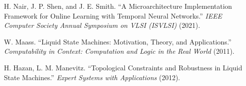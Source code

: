 \begin{thebibliography}{00}

    H. Nair, J. P. Shen, and J. E. Smith.
    ``A Microarchitecture Implementation Framework for Online Learning with Temporal Neural Networks.''
    \textit{IEEE Computer Society Annual Symposium on VLSI (ISVLSI)}
    (2021).

    W. Maass.
    ``Liquid State Machines: Motivation, Theory, and Applications.''
    \textit{Computability in Context: Computation and Logic in the Real World}
    (2011).

    H. Hazan, L. M. Manevitz.
    ``Topological Constraints and Robustness in Liquid State Machines.''
    \textit{Expert Systems with Applications}
    (2012).

\end{thebibliography}